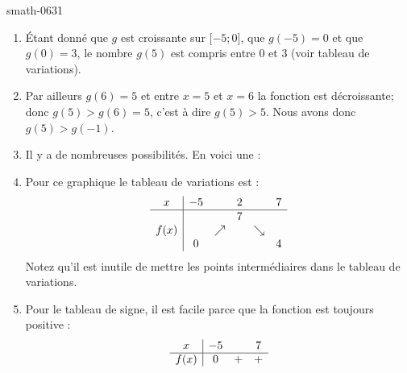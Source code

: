 
\begin{corrige}{smath-0631}

    \begin{enumerate}
        \item
            Étant donné que \( g \) est croissante sur \( \mathopen[ -5 ; 0 \mathclose]\), que \( g(-5)=0\) et que \( g(0)=3\), le nombre \( g(5)\) est compris entre \( 0\) et \( 3\) (voir tableau de variations).
        \item
            Par ailleurs \( g(6)=5\) et entre \( x=5\) et \( x=6\) la fonction est décroissante; donc \( g(5)>g(6)=5\), c'est à dire \( g(5)>5\). Nous avons donc \( g(5)>g(-1)\).

        \item
            Il y a de nombreuses possibilités. En voici une :
            \begin{center}
                
            \end{center}
        \item
            Pour ce graphique le tableau de variations est :
            \begin{equation*}
                \begin{array}[]{c|ccccc}
                    x&-5&&2&&7\\
                    \hline
                    &&&7&&\\
                    f(x)&&\nearrow&&\searrow&\\
                    &0&&&&4\\
                \end{array}
            \end{equation*}
            Notez qu'il est inutile de mettre les points intermédiaires dans le tableau de variations.
        \item
            Pour le tableau de signe, il est facile parce que la fonction est toujours positive :
            \begin{equation*}
                \begin{array}[]{c|ccc}
                     x&-5&&7\\
                 \hline
                      f(x)&0&+&+\\
                       \end{array}
                   \end{equation*}
    \end{enumerate}

\end{corrige}
